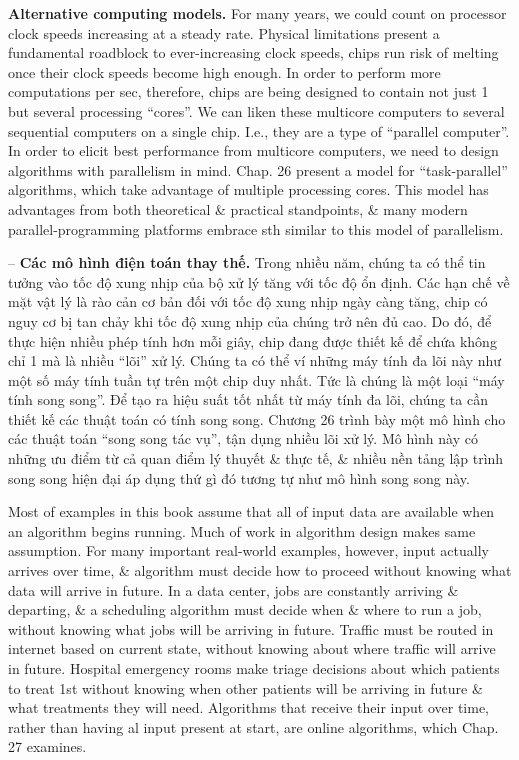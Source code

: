 \documentclass{article}
\begin{document}
\begin{itemize}
\begin{itemize}
\begin{itemize}
            {\bf Alternative computing models.} For many years, we could count on processor clock speeds increasing at a steady rate. Physical limitations present a fundamental roadblock to ever-increasing clock speeds, chips run risk of melting once their clock speeds become high enough. In order to perform more computations per sec, therefore, chips are being designed to contain not just 1 but several processing ``cores''. We can liken these multicore computers to several sequential computers on a single chip. I.e., they are a type of ``parallel computer''. In order to elicit best performance from multicore computers, we need to design algorithms with parallelism in mind. Chap. 26 present a model for ``task-parallel'' algorithms, which take advantage of multiple processing cores. This model has advantages from both theoretical \& practical standpoints, \& many modern parallel-programming platforms embrace sth similar to this model of parallelism.
            
            -- {\bf Các mô hình điện toán thay thế.} Trong nhiều năm, chúng ta có thể tin tưởng vào tốc độ xung nhịp của bộ xử lý tăng với tốc độ ổn định. Các hạn chế về mặt vật lý là rào cản cơ bản đối với tốc độ xung nhịp ngày càng tăng, chip có nguy cơ bị tan chảy khi tốc độ xung nhịp của chúng trở nên đủ cao. Do đó, để thực hiện nhiều phép tính hơn mỗi giây, chip đang được thiết kế để chứa không chỉ 1 mà là nhiều ``lõi'' xử lý. Chúng ta có thể ví những máy tính đa lõi này như một số máy tính tuần tự trên một chip duy nhất. Tức là chúng là một loại ``máy tính song song''. Để tạo ra hiệu suất tốt nhất từ máy tính đa lõi, chúng ta cần thiết kế các thuật toán có tính song song. Chương 26 trình bày một mô hình cho các thuật toán ``song song tác vụ'', tận dụng nhiều lõi xử lý. Mô hình này có những ưu điểm từ cả quan điểm lý thuyết \& thực tế, \& nhiều nền tảng lập trình song song hiện đại áp dụng thứ gì đó tương tự như mô hình song song này.
            
            Most of examples in this book assume that all of input data are available when an algorithm begins running. Much of work in algorithm design makes same assumption. For many important real-world examples, however, input actually arrives over time, \& algorithm must decide how to proceed without knowing what data will arrive in future. In a data center, jobs are constantly arriving \& departing, \& a scheduling algorithm must decide when \& where to run a job, without knowing what jobs will be arriving in future. Traffic must be routed in internet based on current state, without knowing about where traffic will arrive in future. Hospital emergency rooms make triage decisions about which patients to treat 1st without knowing when other patients will be arriving in future \& what treatments they will need. Algorithms that receive their input over time, rather than having al input present at start, are online algorithms, which Chap. 27 examines.
            

\end{itemize}
\end{itemize}
\end{itemize}
\end{document}
